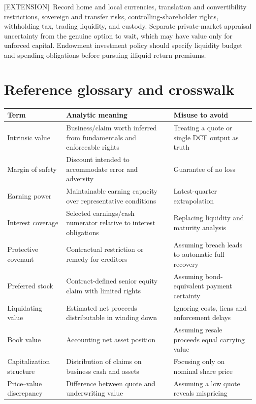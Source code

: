 \documentclass[11pt,letterpaper]{article}
\newcommand{\ext}{\textsf{\color{gold}[EXTENSION]}}
\begin{document}
\ext\ Record home and local currencies, translation and convertibility restrictions, sovereign and transfer risks, controlling-shareholder rights, withholding tax, trading liquidity, and custody. Separate private-market appraisal uncertainty from the genuine option to wait, which may have value only for unforced capital. Endowment investment policy should specify liquidity budget and spending obligations before pursuing illiquid return premiums.

\section{Reference glossary and crosswalk}
\small
\begin{longtable}{>{\raggedright\arraybackslash}p{}>{\raggedright\arraybackslash}p{}>{\raggedright\arraybackslash}p{}}
\toprule Term & Analytic meaning & Misuse to avoid \\
\midrule\endhead
Intrinsic value & Business/claim worth inferred from fundamentals and enforceable rights & Treating a quote or single DCF output as truth \\
Margin of safety & Discount intended to accommodate error and adversity & Guarantee of no loss \\
Earning power & Maintainable earning capacity over representative conditions & Latest-quarter extrapolation \\
Interest coverage & Selected earnings/cash numerator relative to interest obligations & Replacing liquidity and maturity analysis \\
Protective covenant & Contractual restriction or remedy for creditors & Assuming breach leads to automatic full recovery \\
Preferred stock & Contract-defined senior equity claim with limited rights & Assuming bond-equivalent payment certainty \\
Liquidating value & Estimated net proceeds distributable in winding down & Ignoring costs, liens and enforcement delays \\
Book value & Accounting net asset position & Assuming resale proceeds equal carrying value \\
Capitalization structure & Distribution of claims on business cash and assets & Focusing only on nominal share price \\
Price--value discrepancy & Difference between quote and underwriting value & Assuming a low quote reveals mispricing \\
\bottomrule
\end{longtable}
\normalsize
\end{document}
